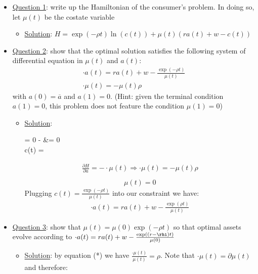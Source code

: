 \documentclass{article}
\begin{document}
\begin{itemize}
    \item  \underline{Question 1}: write up the Hamiltonian of the consumer's problem. In doing so, let $\mu(t)$ be the costate variable
    \begin{itemize}
        \item  \underline{Solution}: $H = \exp (-\rho t) \ln (c(t)) + \mu(t) (ra(t) + w - c(t))$
    \end{itemize}
    \item  \underline{Question 2}: show that the optimal solution satisfies the following system of differential equation in $\mu(t)$ and $a(t)$:
    \begin{gather*}
        \cdot{a}(t) = ra(t) + w - \frac{\exp(-\rho t)}{\mu(t)} \\
        \cdot{\mu}(t) = - \mu(t) \rho
    \end{gather*}
    with $a(0) = \overline{a}$ and $a(1) = 0$. (Hint: given the terminal condition $a(1) = 0$, this problem does not feature the condition $\mu(1) = 0$)
    \begin{itemize}
        \item  \underline{Solution}:
        \begin{arrange*}
             = 0 \Rightarrow {} - \mu &= 0 \\
            \therefore c(t) = 
        \end{arrange*}
        \begin{gather*}
            \frac{\partial H}{\partial a} = - \cdot{\mu}(t) \Rightarrow \cdot{\mu}(t) = -\mu(t)\rho \tag{*} \\
        \end{gather*}
        \begin{gather*}
            \mu(t) = 0
        \end{gather*}
        Plugging $c(t) = \frac{\exp (-\rho t)}{\mu (t)}$ into our constraint we have:
        \begin{gather*}
            \cdot{a}(t) = ra(t) + w - \frac{\exp(\rho t)}{\mu (t)}
        \end{gather*}
    \end{itemize}
    \item  \underline{Question 3}: show that $\mu(t) = \mu(0) \exp (-\rho t)$ so that optimal assets evolve according to $\cdot{a}(t) = ra(t) + w - \tfrac{\exp ((r-\rhi)t)}{\mu(0)}$
    \begin{itemize}
        \item  \underline{Solution}: by equation (*) we have $\tfrac{\cdot{\mu}(t)}{\mu(t)} = \rho$. Note that $\cdot{\mu}(t) = \partial \mu(t)$ and therefore:

\end{itemize}
\end{itemize}
\end{document}

